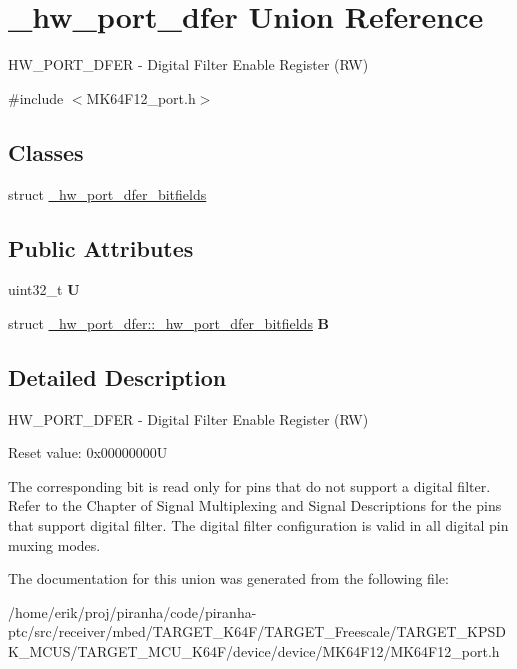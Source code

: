 \hypertarget{union__hw__port__dfer}{}\section{\+\_\+hw\+\_\+port\+\_\+dfer Union Reference}
\label{union__hw__port__dfer}


H\+W\+\_\+\+P\+O\+R\+T\+\_\+\+D\+F\+ER -\/ Digital Filter Enable Register (RW)  




{\ttfamily \#include $<$M\+K64\+F12\+\_\+port.\+h$>$}

\subsection*{Classes}
\begin{DoxyCompactItemize}
\item 
struct \hyperlink{struct__hw__port__dfer_1_1__hw__port__dfer__bitfields}{\+\_\+hw\+\_\+port\+\_\+dfer\+\_\+bitfields}
\end{DoxyCompactItemize}
\subsection*{Public Attributes}
\begin{DoxyCompactItemize}
\item 
uint32\+\_\+t {\bfseries U}\hypertarget{union__hw__port__dfer_a88ecbd670f779dfc0b14e01d5e579a80}{}\label{union__hw__port__dfer_a88ecbd670f779dfc0b14e01d5e579a80}

\item 
struct \hyperlink{struct__hw__port__dfer_1_1__hw__port__dfer__bitfields}{\+\_\+hw\+\_\+port\+\_\+dfer\+::\+\_\+hw\+\_\+port\+\_\+dfer\+\_\+bitfields} {\bfseries B}\hypertarget{union__hw__port__dfer_af2940ab7647c78734e3b84f6db022e84}{}\label{union__hw__port__dfer_af2940ab7647c78734e3b84f6db022e84}

\end{DoxyCompactItemize}


\subsection{Detailed Description}
H\+W\+\_\+\+P\+O\+R\+T\+\_\+\+D\+F\+ER -\/ Digital Filter Enable Register (RW) 

Reset value\+: 0x00000000U

The corresponding bit is read only for pins that do not support a digital filter. Refer to the Chapter of Signal Multiplexing and Signal Descriptions for the pins that support digital filter. The digital filter configuration is valid in all digital pin muxing modes. 

The documentation for this union was generated from the following file\+:\begin{DoxyCompactItemize}
\item 
/home/erik/proj/piranha/code/piranha-\/ptc/src/receiver/mbed/\+T\+A\+R\+G\+E\+T\+\_\+\+K64\+F/\+T\+A\+R\+G\+E\+T\+\_\+\+Freescale/\+T\+A\+R\+G\+E\+T\+\_\+\+K\+P\+S\+D\+K\+\_\+\+M\+C\+U\+S/\+T\+A\+R\+G\+E\+T\+\_\+\+M\+C\+U\+\_\+\+K64\+F/device/device/\+M\+K64\+F12/M\+K64\+F12\+\_\+port.\+h\end{DoxyCompactItemize}
